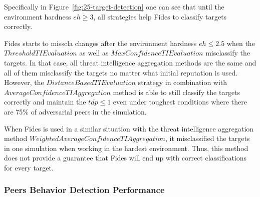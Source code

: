 Specifically in Figure~\ref{fig:25-target-detection} one can see that until the environment hardness $eh \geq 3$, all strategies help Fides to classify targets correctly.

Fides starts to misscla changes after the environment hardness $eh \leq 2.5$ when the $ThresholdTIEvaluation$ as well as $MaxConfidenceTIEvaluation$ misclassify the targets. In that case, all threat intelligence aggregation methods are the same and all of them misclassify the targets no matter what initial reputation is used.
However, the $DistanceBasedTIEvaluation$ strategy in combination with $AverageConfidenceTIAggregation$ method is able to still classify the targets correctly and maintain the $tdp \leq 1$ even under toughest conditions where there are 75\% of adversarial peers in the simulation.

When Fides is used in a similar situation with the threat intelligence aggregation method $WeightedAverageConfidenceTIAggregation$, it misclassified the targets in one simulation when working in the hardest environment.
Thus, this method does not provide a guarantee that Fides will end up with correct classifications for every target.

\cleartoleftpage
\subsubsection{Peers Behavior Detection Performance}


